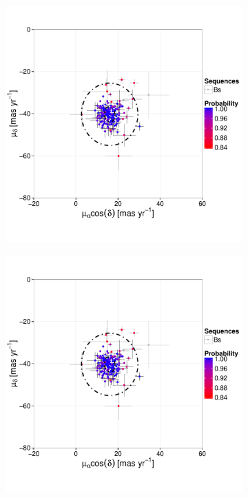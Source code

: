\begin{figure}[ht!]
    \centering
    \begin{subfigure}[t]{0.45\textwidth}
    \centering
       \includegraphics[page=2,width=\textwidth]{background/Figures/BHM/Bs_members.pdf}
        \caption{}
    \end{subfigure}
    \begin{subfigure}[t]{0.45\textwidth}
    \centering
     \includegraphics[page=3,width=\textwidth]{background/Figures/BHM/Bs_members.pdf}

\end{subfigure}
\end{figure}
